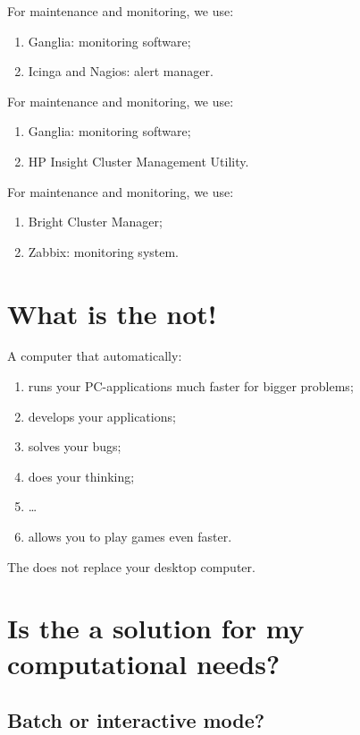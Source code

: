 \ifantwerpen
    For maintenance and monitoring, we use:
    \begin{enumerate}
      \item  Ganglia: monitoring software;
      \item  Icinga and Nagios: alert manager.
    \end{enumerate}
\fi
\ifleuven
    For maintenance and monitoring, we use:
    \begin{enumerate}
      \item  Ganglia: monitoring software;
      \item  HP Insight Cluster Management Utility.
    \end{enumerate}
\fi
\ifbrussel
    For maintenance and monitoring, we use:
    \begin{enumerate}
      \item  Bright Cluster Manager;
      \item  Zabbix: monitoring system.
    \end{enumerate}
\fi


\section{What is the \hpc not!}
\label{sec:what-is-the-hpc-not}

A computer that automatically:
\begin{enumerate}
  \item  runs your PC-applications much faster for bigger problems;
  \item  develops your applications;
  \item  solves your bugs;
  \item  does your thinking;
  \item  \dots
  \item  allows you to play games even faster.
\end{enumerate}
The \hpc does not replace your desktop computer.

\section{Is the \hpc a solution for my computational needs?}
\label{sec:is-the-hpc-a-solution-for-my-computational-needs}

\subsection{Batch or interactive mode?}
\label{sec:batch-or-interactive-mode}


